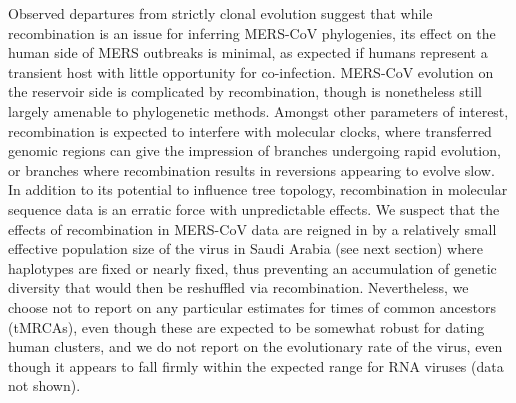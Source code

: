 \documentclass[9pt,lineno]{elife}
\begin{document}
Observed departures from strictly clonal evolution suggest that while recombination is an issue for inferring MERS-CoV phylogenies, its effect on the human side of MERS outbreaks is minimal, as expected if humans represent a transient host with little opportunity for co-infection.
MERS-CoV evolution on the reservoir side is complicated by recombination, though is nonetheless still largely amenable to phylogenetic methods.
Amongst other parameters of interest, recombination is expected to interfere with molecular clocks, where transferred genomic regions can give the impression of branches undergoing rapid evolution, or branches where recombination results in reversions appearing to evolve slow.
In addition to its potential to influence tree topology, recombination in molecular sequence data is an erratic force with unpredictable effects.
We suspect that the effects of recombination in MERS-CoV data are reigned in by a relatively small effective population size of the virus in Saudi Arabia (see next section) where haplotypes are fixed or nearly fixed, thus preventing an accumulation of genetic diversity that would then be reshuffled via recombination.
Nevertheless, we choose not to report on any particular estimates for times of common ancestors (tMRCAs), even though these are expected to be somewhat robust for dating human clusters, and we do not report on the evolutionary rate of the virus, even though it appears to fall firmly within the expected range for RNA viruses (data not shown).

\end{document}
